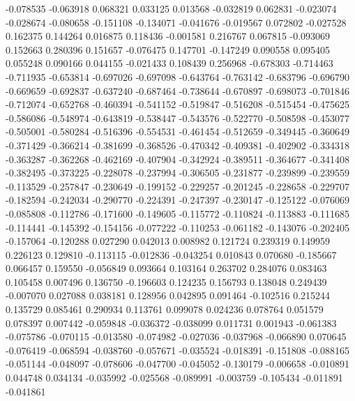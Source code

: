 -0.078535
-0.063918
0.068321
0.033125
0.013568
-0.032819
0.062831
-0.023074
-0.028674
-0.080658
-0.151108
-0.134071
-0.041676
-0.019567
0.072802
-0.027528
0.162375
0.144264
0.016875
0.118436
-0.001581
0.216767
0.067815
-0.093069
0.152663
0.280396
0.151657
-0.076475
0.147701
-0.147249
0.090558
0.095405
0.055248
0.090166
0.044155
-0.021433
0.108439
0.256968
-0.678303
-0.714463
-0.711935
-0.653814
-0.697026
-0.697098
-0.643764
-0.763142
-0.683796
-0.696790
-0.669659
-0.692837
-0.637240
-0.687464
-0.738644
-0.670897
-0.698073
-0.701846
-0.712074
-0.652768
-0.460394
-0.541152
-0.519847
-0.516208
-0.515454
-0.475625
-0.586086
-0.548974
-0.643819
-0.538447
-0.543576
-0.522770
-0.508598
-0.453077
-0.505001
-0.580284
-0.516396
-0.554531
-0.461454
-0.512659
-0.349445
-0.360649
-0.371429
-0.366214
-0.381699
-0.368526
-0.470342
-0.409381
-0.402902
-0.334318
-0.363287
-0.362268
-0.462169
-0.407904
-0.342924
-0.389511
-0.364677
-0.341408
-0.382495
-0.373225
-0.228078
-0.237994
-0.306505
-0.231877
-0.239899
-0.239559
-0.113529
-0.257847
-0.230649
-0.199152
-0.229257
-0.201245
-0.228658
-0.229707
-0.182594
-0.242034
-0.290770
-0.224391
-0.247397
-0.230147
-0.125122
-0.076069
-0.085808
-0.112786
-0.171600
-0.149605
-0.115772
-0.110824
-0.113883
-0.111685
-0.114441
-0.145392
-0.154156
-0.077222
-0.110253
-0.061182
-0.143076
-0.202405
-0.157064
-0.120288
0.027290
0.042013
0.008982
0.121724
0.239319
0.149959
0.226123
0.129810
-0.113115
-0.012836
-0.043254
0.010843
0.070680
-0.185667
0.066457
0.159550
-0.056849
0.093664
0.103164
0.263702
0.284076
0.083463
0.105458
0.007496
0.136750
-0.196603
0.124235
0.156793
0.138048
0.249439
-0.007070
0.027088
0.038181
0.128956
0.042895
0.091464
-0.102516
0.215244
0.135729
0.085461
0.290934
0.113761
0.099078
0.024236
0.078764
0.051579
0.078397
0.007442
-0.059848
-0.036372
-0.038099
0.011731
0.001943
-0.061383
-0.075786
-0.070115
-0.013580
-0.074982
-0.027036
-0.037968
-0.066890
0.070645
-0.076419
-0.068594
-0.038760
-0.057671
-0.035524
-0.018391
-0.151808
-0.088165
-0.051144
-0.048097
-0.078606
-0.047700
-0.045052
-0.130179
-0.006658
-0.010891
0.044748
0.034134
-0.035992
-0.025568
-0.089991
-0.003759
-0.105434
-0.011891
-0.041861
